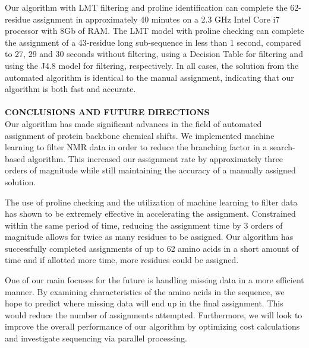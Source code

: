 \documentclass{article}
\begin{document}
Our algorithm with LMT filtering and proline identification can complete the 62-residue assignment in approximately 40 minutes on a 2.3 GHz Intel Core i7 processor with 8Gb of RAM. The LMT model with proline checking can complete the assignment of a 43-residue long sub-sequence in less than 1 second, compared to 27, 29 and 30 seconds without filtering, using a Decision Table for filtering and using the J4.8 model for filtering, respectively. In all cases, the solution from the automated algorithm is identical to the manual assignment, indicating that our algorithm is both fast and accurate. 
\\\\
\noindent\textbf {CONCLUSIONS AND FUTURE DIRECTIONS}\\
Our algorithm has made significant advances in the field of automated assignment of protein backbone chemical shifts. We implemented machine learning to filter NMR data in order to reduce the branching factor in a search-based algorithm. This increased our assignment rate by approximately three orders of magnitude while still maintaining the accuracy of a manually assigned solution.

The use of proline checking and the utilization of machine learning to filter data has shown to be extremely effective in accelerating the assignment. Constrained within the same period of time, reducing the assignment time by 3 orders of magnitude allows for twice as many residues to be assigned. Our algorithm has successfully completed assignments of up to 62 amino acids in a short amount of time and if allotted more time, more residues could be assigned.

One of our main focuses for the future is handling missing data in a more efficient manner. By examining characteristics of the amino acids in the sequence, we hope to predict where missing data will end up in the final assignment. This would reduce the number of assignments attempted. Furthermore, we will look to improve the overall performance of our algorithm by optimizing cost calculations and investigate sequencing via parallel processing.
\end{document}
